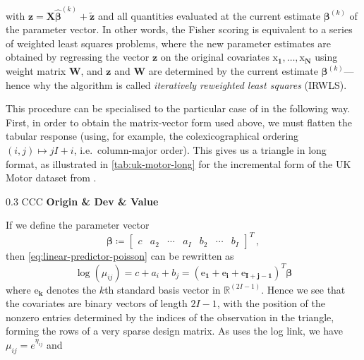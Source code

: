 \documentclass[a4paper]{book}
\begin{document}
with $\mathbf{z} = \mathbf{X} \bm{\widehat{\beta}}^{(k)} + \mathbf{\tilde{z}}$ and all quantities evaluated at the current estimate $\bm{\beta}^{(k)}$ of the parameter vector. In other words, the Fisher scoring is equivalent to a series of weighted least squares problems, where the new parameter estimates are obtained by regressing the vector $\mathbf{z}$ on the original covariates $\bm{\mathrm{x}_1}, \dots, \bm{\mathrm{x}_N}$ using weight matrix $\mathbf{W}$, and $\mathbf{z}$ and $\mathbf{W}$ are determined by the current estimate $\bm{\beta}^{(k)}$---hence why the algorithm is called \emph{iteratively reweighted least squares} (IRWLS).

This procedure can be specialised to the particular case of  in the following way. First, in order to obtain the matrix-vector form used above, we must flatten the tabular response (using, for example, the colexicographical ordering $(i, j) \mapsto j I + i$, i.e.\ column-major order). This gives us a triangle in long format, as illustrated in \cref{tab:uk-motor-long} for the incremental form of the UK Motor dataset from \textcite{christofides}.
\begin{table}[!htb]
  \centering
  \begin{tabularx}{0.3 \linewidth}{CCC}\toprule%
    \bf{Origin} & \bf{Dev} & \bf{Value} \\ \midrule
    \bottomrule%
  \end{tabularx}
  \caption{UK Motor incremental claims triangle in long format}
  \label{tab:uk-motor-long}
\end{table}
If we define the parameter vector
\begin{equation}
  \bm{\beta} \coloneqq \begin{bmatrix} c & a_2 & \cdots & a_I & b_2 & \cdots & b_I \end{bmatrix}^T \,,
\end{equation}
then \cref{eq:linear-predictor-poisson} can be rewritten as
\begin{equation} \label{eq:poisson-covariates}
  \log(\mu_{ij}) = c + a_i + b_j = (\bm{\mathrm{e}_1} + \bm{\mathrm{e}_i} + \bm{\mathrm{e}_{I + j - 1}})^T \bm{\beta}
\end{equation}
where $\bm{\mathrm{e}_k}$ denotes the $k$th standard basis vector in $\mathbb{R}^{(2I - 1)}$. Hence we see that the covariates are binary vectors of length $2I - 1$, with the position of the nonzero entries determined by the indices of the observation in the triangle, forming the rows of a very sparse design matrix. As  uses the log link, we have $\mu_{ij} = e^{\eta_{ij}}$ and
\end{document}
